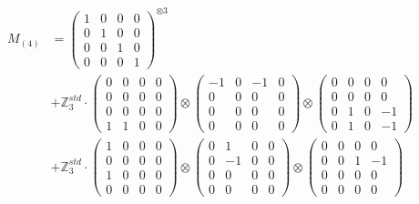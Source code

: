 \documentclass{article}
\newcommand{\Mthree}{%
    M_{(4)}
}
\begin{document}
        \footnotesize{
        \begin{align}
        \Mthree
        &= \label{Rs1-Rc16-Solution-6-c1} \begin{pmatrix} 1 & 0 & 0 & 0 \\ 0 & 1 & 0 & 0 \\ 0 & 0 & 1 & 0 \\ 0 & 0 & 0 & 1 \end{pmatrix}^{\otimes 3} \\
        &+ \label{Rs1-Rc16-Solution-6-c2} \mathbb{Z}_3^{std} \cdot 
            \begin{pmatrix} 0 & 0 & 0 & 0 \\ 0 & 0 & 0 & 0 \\ 0 & 0 & 0 & 0 \\ 1 & 1 & 0 & 0 \end{pmatrix} \otimes 
            \begin{pmatrix} -1 & 0 & -1 & 0 \\ 0 & 0 & 0 & 0 \\ 0 & 0 & 0 & 0 \\ 0 & 0 & 0 & 0 \end{pmatrix} \otimes 
            \begin{pmatrix} 0 & 0 & 0 & 0 \\ 0 & 0 & 0 & 0 \\ 0 & 1 & 0 & -1 \\ 0 & 1 & 0 & -1 \end{pmatrix} \\ 
        &+ \label{Rs1-Rc16-Solution-6-c3} \mathbb{Z}_3^{std} \cdot 
            \begin{pmatrix} 1 & 0 & 0 & 0 \\ 0 & 0 & 0 & 0 \\ 1 & 0 & 0 & 0 \\ 0 & 0 & 0 & 0 \end{pmatrix} \otimes 
            \begin{pmatrix} 0 & 1 & 0 & 0 \\ 0 & -1 & 0 & 0 \\ 0 & 0 & 0 & 0 \\ 0 & 0 & 0 & 0 \end{pmatrix} \otimes 
            \begin{pmatrix} 0 & 0 & 0 & 0 \\ 0 & 0 & 1 & -1 \\ 0 & 0 & 0 & 0 \\ 0 & 0 & 0 & 0 \end{pmatrix} \\ 

\end{align}}
\end{document}
